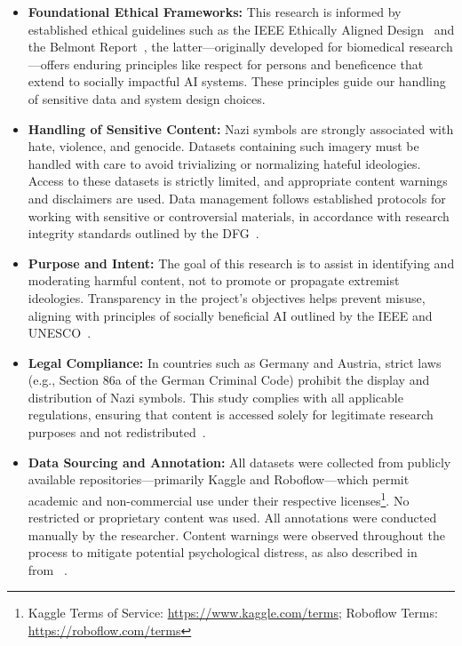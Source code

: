 \begin{itemize}
    \item \textbf{Foundational Ethical Frameworks:} This research is informed by established ethical guidelines such
    as the IEEE Ethically Aligned Design~\parencite{ieee2021ethics} and the Belmont Report~\parencite{belmont1979},
    the latter—originally developed for biomedical research—offers enduring principles like
    respect for persons and beneficence that extend to socially impactful AI systems. These principles guide our
    handling of sensitive data and system design choices.

    \item \textbf{Handling of Sensitive Content:} Nazi symbols are strongly associated with hate, violence, and
    genocide. Datasets containing such imagery must be handled with care to avoid trivializing or normalizing hateful
    ideologies. Access to these datasets is strictly limited, and appropriate content warnings and disclaimers are used.
    Data management follows established protocols for working with sensitive or controversial materials, in accordance
    with research integrity standards outlined by the \ac{DFG}~\parencite{dfg2022}.

    \item \textbf{Purpose and Intent:} The goal of this research is to assist in identifying and moderating harmful
    content, not to promote or propagate extremist ideologies. Transparency in the project's objectives helps
    prevent misuse, aligning with principles of socially beneficial AI outlined by the \ac{IEEE} and
    \ac{UNESCO}~\parencite{ieee2021ethics,unesco2021}.

    \item \textbf{Legal Compliance:} In countries such as Germany and Austria, strict laws (e.g., Section 86a of the
    German Criminal Code) prohibit the display and distribution of Nazi symbols. This study complies with all
    applicable regulations, ensuring that content is accessed solely for legitimate research purposes and not
    redistributed~\parencite{bundesregierung2023}.

    \item \textbf{Data Sourcing and Annotation:} All datasets were collected from publicly available
    repositories—primarily Kaggle and Roboflow—which permit academic and non-commercial use under their respective
    licenses\footnote{Kaggle Terms of Service: \url{https://www.kaggle.com/terms}; Roboflow Terms:
    \url{https://roboflow.com/terms}}. No restricted or proprietary content was used. All annotations were conducted
    manually by the researcher. Content warnings were observed throughout the process to mitigate potential
    psychological distress, as also described in ~ from ~.


\end{itemize}
